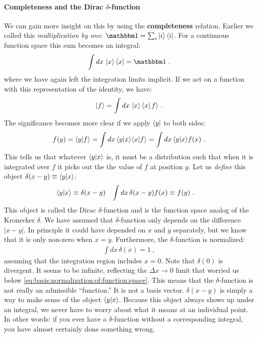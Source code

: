 \paragraph{Completeness and the Dirac $\delta$-function} We can gain more insight on this by using the \textbf{completeness} relation. Earlier we called this \emph{multiplication by one}: $\one = \sum_i \ket{i}\bra{i}$. For a continuous function space this sum becomes an integral:
\begin{align}
    \int dx \, \ket{x}\bra{x} = \one \ .
    \label{eq:completeness:continuum}
\end{align}
where we have again left the integration limits implicit. If we act on a function with this representation of the identity, we have:
\begin{align}
    \left|f\right\rangle = \int dx\, \left|x\right\rangle\left\langle x\right| f\rangle  \ .
    \label{eq:function:space:completeness:ket}
\end{align}
The significance becomes more clear if we apply $\left\langle y\right|$ to both sides:
\begin{align}
    f(y) =  \langle y | f \rangle = \int dx\, \langle y | x \rangle \langle x | f \rangle 
    = \int dx\, \langle y | x \rangle f(x) \ .
\end{align}
This tells us that whatever $\langle y | x\rangle$ is, it must be a distribution such that when it is integrated over $f$ it picks out the the value of $f$ at position $y$. Let us \emph{define} this object $\delta(x-y) \equiv \langle y | x \rangle$:
\begin{align}
    \langle y | x \rangle &\equiv \delta(x-y) 
    &
    \int dx\, \delta(x-y) f(x) &\equiv f(y) \ .
\end{align}
This object is called the Dirac $\delta$-function and is the function space analog of the Kronecker $\delta$. We have assumed that $\delta$-function only depends on the difference $|x-y|$. In principle it could have depended on $x$ and $y$ separately, but we know that it is only non-zero when $x=y$. Furthermore, the $\delta$-function is normalized:
\begin{align}
    \int dx\, \delta(x) = 1 \ ,
 \end{align}
 assuming that the integration region includes $x=0$. Note that $\delta(0)$ is divergent. It seems to be infinite, reflecting the $\Delta x\to 0$ limit that worried us below \eqref{eq:basis:normalization:of:function:space}.  This means that the $\delta$-function is not really an admissible ``function.'' It is not a basis vector. $\delta(x-y)$ is simply a way to make sense of the object $\langle y | x\rangle$. Because this object always shows up under an integral, we never have to worry about what it means at an individual point. In other words: if you ever have a $\delta$-function without a corresponding integral, you have almost certainly done something wrong. 

